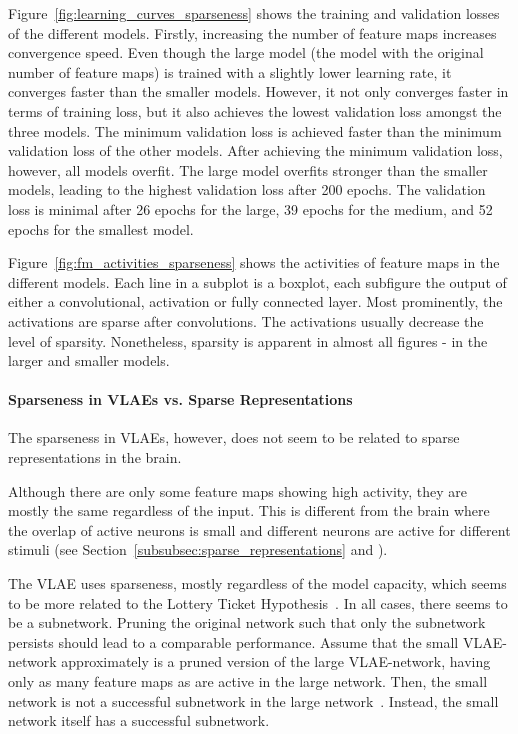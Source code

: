 Figure~\ref{fig:learning_curves_sparseness} shows the training and validation losses of the different models.
Firstly, increasing the number of feature maps increases convergence speed.
Even though the large model (the model with the original number of feature maps) is trained with a slightly lower learning rate, it converges faster than the smaller models.
However, it not only converges faster in terms of training loss, but it also achieves the lowest validation loss amongst the three models.
The minimum validation loss is achieved faster than the minimum validation loss of the other models.
After achieving the minimum validation loss, however, all models overfit.
The large model overfits stronger than the smaller models, leading to the highest validation loss after 200 epochs.
The validation loss is minimal after 26 epochs for the large, 39 epochs for the medium, and 52 epochs for the smallest model.

Figure~\ref{fig:fm_activities_sparseness} shows the activities of feature maps in the different models.
Each line in a subplot is a boxplot, each subfigure the output of either a convolutional, activation or fully connected layer.
Most prominently, the activations are sparse after convolutions.
The activations usually decrease the level of sparsity.
Nonetheless, sparsity is apparent in almost all figures - in the larger and smaller models.

\paragraph{Sparseness in \acp{VLAE} vs. Sparse Representations}
The sparseness in \acp{VLAE}, however, does not seem to be related to sparse representations in the brain.

Although there are only some feature maps showing high activity, they are mostly the same regardless of the input.
This is different from the brain where the overlap of active neurons is small and different neurons are active for different stimuli (see Section~\ref{subsubsec:sparse_representations} and \citet{yoshida2020natural}).

The \ac{VLAE} uses sparseness, mostly regardless of the model capacity, which seems to be more related to the Lottery Ticket Hypothesis~\citep{frankle2018lottery}.
In all cases, there seems to be a subnetwork.
Pruning the original network such that only the subnetwork persists should lead to a comparable performance.
Assume that the small \ac{VLAE}-network approximately is a pruned version of the large \ac{VLAE}-network, having only as many feature maps as are active in the large network.
Then, the small network is not a successful subnetwork in the large network~\citep{frankle2018lottery}.
Instead, the small network itself has a successful subnetwork.


